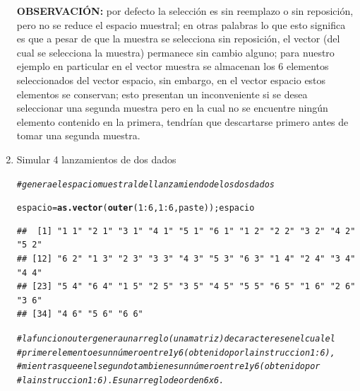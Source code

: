 \documentclass[12pt,letterpaper]{article}\usepackage[]{graphicx}\usepackage[]{color}
\makeatletter
\newcommand{\hlnum}[1]{\textcolor[rgb]{0.686,0.059,0.569}{#1}}%
\newcommand{\hlcom}[1]{\textcolor[rgb]{0.678,0.584,0.686}{\textit{#1}}}%
\newcommand{\hlopt}[1]{\textcolor[rgb]{0,0,0}{#1}}%
\newcommand{\hlstd}[1]{\textcolor[rgb]{0.345,0.345,0.345}{#1}}%
\newcommand{\hlkwb}[1]{\textcolor[rgb]{0.69,0.353,0.396}{#1}}%
\newcommand{\hlkwd}[1]{\textcolor[rgb]{0.737,0.353,0.396}{\textbf{#1}}}%
\newenvironment{kframe}{%
 \def\at@end@of@kframe{}%
 \ifinner\ifhmode%
  \def\at@end@of@kframe{\end{minipage}}%
  \begin{minipage}{\columnwidth}%
 \fi\fi%
 \def\FrameCommand##1{\hskip\@totalleftmargin \hskip-\fboxsep
 \colorbox{shadecolor}{##1}\hskip-\fboxsep
     \hskip-\linewidth \hskip-\@totalleftmargin \hskip\columnwidth}%
 \MakeFramed {\advance\hsize-\width
   \@totalleftmargin\z@ \linewidth\hsize
   \@setminipage}}%
 {\par\unskip\endMakeFramed%
 \at@end@of@kframe}
\newenvironment{knitrout}{}{} %
\makeatother
\begin{document}
\begin{enumerate}
\textbf{OBSERVACI\'ON:} por defecto la selecci\'on es sin reemplazo o sin reposici\'on, pero no se reduce el espacio muestral; en otras palabras lo que esto significa es que a pesar de que la muestra se selecciona sin reposici\'on, el vector (del cual se selecciona la muestra) permanece sin cambio alguno; para nuestro ejemplo en particular en el vector muestra se almacenan los 6 elementos seleccionados del vector espacio, sin embargo, en el vector espacio estos elementos se conservan; esto presentan un inconveniente si se desea seleccionar una segunda muestra pero en la cual no se encuentre ning\'un elemento contenido en la primera, tendr\'ian que descartarse primero antes de tomar una segunda muestra.\\

\item Simular 4 lanzamientos de dos dados 

\begin{knitrout}
\color{fgcolor}\begin{kframe}
\begin{alltt}
\hlcom{# genera el espacio muestral del lanzamiendo de los dos dados}

\hlstd{espacio} \hlkwb{=} \hlkwd{as.vector}\hlstd{(}\hlkwd{outer}\hlstd{(}\hlnum{1}\hlopt{:}\hlnum{6}\hlstd{,} \hlnum{1}\hlopt{:}\hlnum{6}\hlstd{, paste)); espacio}
\end{alltt}
\begin{verbatim}
##  [1] "1 1" "2 1" "3 1" "4 1" "5 1" "6 1" "1 2" "2 2" "3 2" "4 2" "5 2"
## [12] "6 2" "1 3" "2 3" "3 3" "4 3" "5 3" "6 3" "1 4" "2 4" "3 4" "4 4"
## [23] "5 4" "6 4" "1 5" "2 5" "3 5" "4 5" "5 5" "6 5" "1 6" "2 6" "3 6"
## [34] "4 6" "5 6" "6 6"
\end{verbatim}
\end{kframe}
\end{knitrout}

\begin{knitrout}
\color{fgcolor}\begin{kframe}
\begin{alltt}
\hlcom{# la funcion outer genera un arreglo (una matriz) decaracteres en el cual el }
\hlcom{# primer elemento es un número entre 1 y 6 (obtenido por la instruccion 1:6),}
\hlcom{# mientras que en el segundo tambien es un número entre 1 y 6 (obtenido por }
\hlcom{# la instruccion 1:6). Es un arreglo de orden 6 x 6. }
\end{alltt}
\end{kframe}
\end{knitrout}


\end{enumerate}
\end{document}
